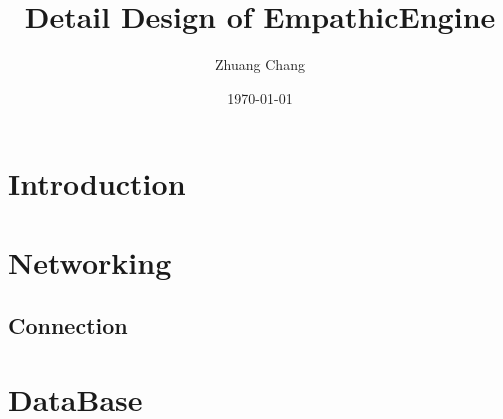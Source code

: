 \documentclass{article}
\begin{document}
\title{Detail Design of EmpathicEngine}
\author{Zhuang Chang}
\date{\today}
\maketitle

\tableofcontents

\section{Introduction}

\section{Networking}
\subsection{Connection}

\section{DataBase}
\end{document}
